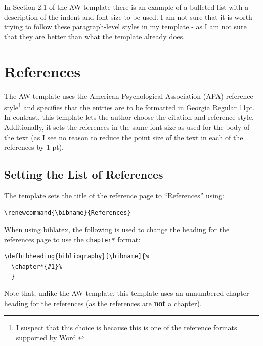 \documentclass[12pt, twoside]{article}
\begin{document}
In Section 2.1 of the AW-template there is an example of a bulleted list with a description of the indent and font size to be used. I am not sure that it is worth trying to follow these paragraph-level styles in my template - as I am not sure that they are better than what the template already does.



\section{References}
\label{sec:cycle3Refrences}
The AW-template uses the American Psychological Association (APA) reference style\footnote{I suspect that this choice is because this is one of the reference formats supported by Word.} and specifies that the entries are to be formatted in Georgia Regular 11pt. In contrast, this template lets the author choose the citation and reference style. Additionally, it sets the references in the same font size as used for the body of the text (as I see no reason to reduce the point size of the text in each of the references by 1 pt).

\subsection{Setting the List of References}

The template sets the title of the reference page to \enquote{References} using:
\begin{lstlisting}[style=latexExampleForAuthors]
\renewcommand{\bibname}{References}
\end{lstlisting}

When using biblatex, the following is used to change the heading for the references page to use the \texttt{chapter*} format:
\begin{lstlisting}[style=latexExampleForAuthors]
\defbibheading{bibliography}[\bibname]{%
  \chapter*{#1}%
  }
\end{lstlisting}

Note that, unlike the AW-template, this template uses an unnumbered chapter heading for the references (as the references are \textbf{not} a chapter).
\end{document}
